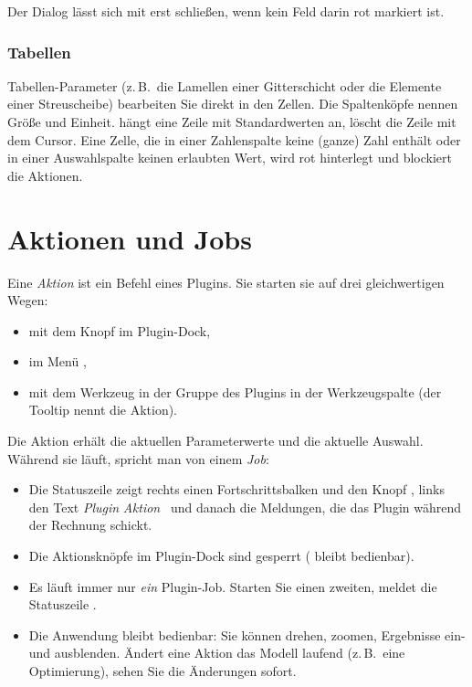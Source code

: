 Der Dialog lässt sich mit  erst schließen, wenn kein Feld darin rot markiert ist.

\subsubsection{Tabellen}\label{sec:plugin-tabelle}

Tabellen-Parameter (z.\,B.\ die Lamellen einer Gitterschicht oder die Elemente einer
Streuscheibe) bearbeiten Sie direkt in den Zellen. Die Spaltenköpfe nennen Größe und Einheit.
 hängt eine Zeile mit Standardwerten an,  löscht die Zeile mit
dem Cursor. Eine Zelle, die in einer Zahlenspalte keine (ganze) Zahl enthält oder in einer
Auswahlspalte keinen erlaubten Wert, wird rot hinterlegt und blockiert die Aktionen.

\section{Aktionen und Jobs}\label{sec:plugin-jobs}

Eine \emph{Aktion} ist ein Befehl eines Plugins. Sie starten sie auf drei gleichwertigen
Wegen:

\begin{itemize}
  \item mit dem Knopf im Plugin-Dock,
  \item im Menü ,
  \item mit dem Werkzeug in der Gruppe des Plugins in der Werkzeugspalte (der Tooltip nennt
        die Aktion).
\end{itemize}

Die Aktion erhält die aktuellen Parameterwerte und die aktuelle Auswahl. Während sie läuft,
spricht man von einem \emph{Job}:

\begin{itemize}
  \item Die Statuszeile zeigt rechts einen Fortschrittsbalken und den Knopf , links
        den Text \textit{Plugin}\code{:} \textit{Aktion}~ und danach die Meldungen, die
        das Plugin während der Rechnung schickt.
  \item Die Aktionsknöpfe im Plugin-Dock sind gesperrt ( bleibt
        bedienbar).
  \item Es läuft immer nur \emph{ein} Plugin-Job. Starten Sie einen zweiten, meldet die
        Statuszeile .
  \item Die Anwendung bleibt bedienbar: Sie können drehen, zoomen, Ergebnisse ein- und
        ausblenden. Ändert eine Aktion das Modell laufend (z.\,B.\ eine Optimierung), sehen Sie
        die Änderungen sofort.
\end{itemize}

